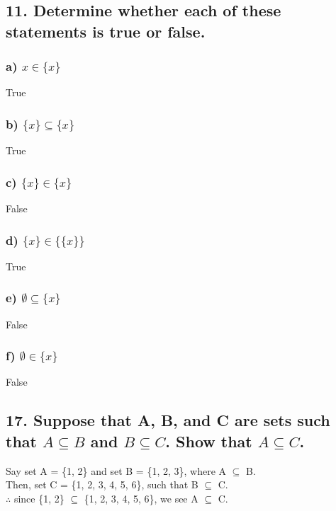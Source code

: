 \documentclass[11pt, oneside]{article} %
\numberwithin{equation}{section} %
\numberwithin{figure}{section} %
\numberwithin{table}{section} %
\begin{document}

\subsection{11. Determine whether each of these statements is true or false.}
\subsubsection{a) $x\in\{x\}$}
True
\subsubsection{b) $\{x\}\subseteq\{x\}$}
True
\subsubsection{c) $\{x\}\in\{x\}$}
False
\subsubsection{d) $\{x\}\in\{\{x\}\}$}
True
\subsubsection{e) $\emptyset\subseteq\{x\}$}
False
\subsubsection{f) $\emptyset\in\{x\}$}
False


\subsection{17. Suppose that A, B, and C are sets such that $A \subseteq B$ and $B \subseteq C$. Show that $A \subseteq C$.}
Say set A = \{1, 2\} and set B = \{1, 2, 3\}, where A $\subseteq$ B.\\
Then, set C = \{1, 2, 3, 4, 5, 6\}, such that B $\subseteq$ C.\\
$\therefore$ since \{1, 2\} $\subseteq$ \{1, 2, 3, 4, 5, 6\}, we see A $\subseteq$ C.
\end{document}
